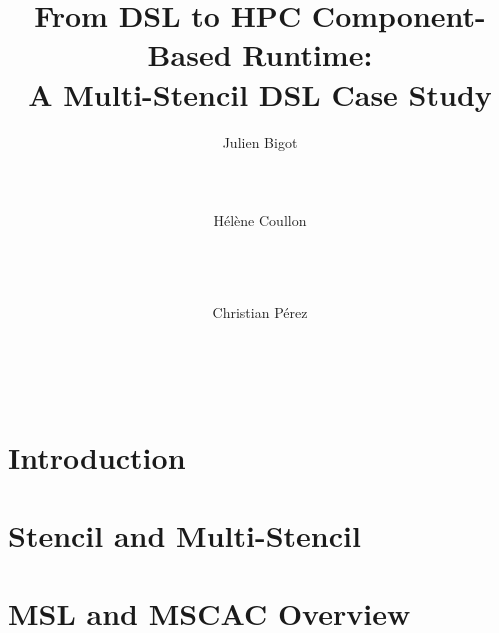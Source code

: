 \documentclass{acm_proc_article-sp}
\begin{document}
\title{From DSL to HPC Component-Based Runtime:\\ A Multi-Stencil DSL Case Study}

\author{
\alignauthor
Julien Bigot\\
       \\
       \\
       \\ %
\alignauthor
H\'el\`ene Coullon\\
       \\
       \\
       \\
\and
\alignauthor
Christian P\'erez\\
       \\
       \\
       \\
}

\maketitle

\begin{abstract}

\end{abstract}


\section{Introduction}
\label{sect:intro}

\section{Stencil and Multi-Stencil}
\label{sect:concept}

\section{MSL and MSCAC Overview }
\label{sect:mscac}

\end{document}
